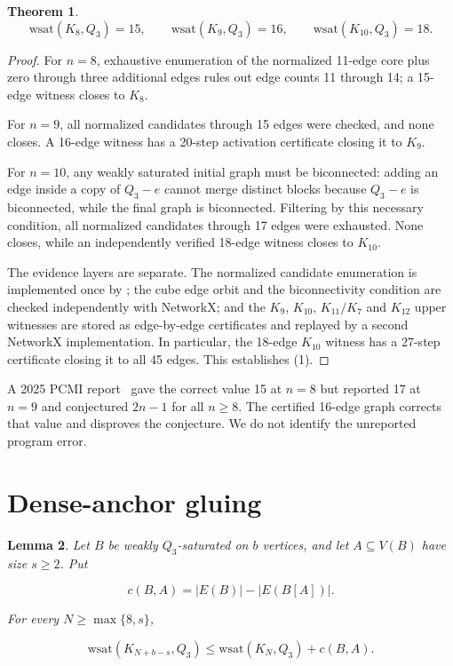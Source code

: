 \documentclass[11pt]{article}
\newtheorem{theorem}{Theorem}
\newtheorem{lemma}[theorem]{Lemma}
\numberwithin{equation}{section}
\begin{document}
\begin{theorem}


\[
\mathrm{wsat}(K_8,Q_3)=15,\qquad
\mathrm{wsat}(K_9,Q_3)=16,\qquad
\mathrm{wsat}(K_{10},Q_3)=18.
\tag{1}
\]

\end{theorem}

\begin{proof}


For $n=8$, exhaustive enumeration of the normalized 11-edge core plus zero through three
additional edges rules out edge counts 11 through 14; a 15-edge witness closes to $K_8$.

For $n=9$, all normalized candidates through 15 edges were checked, and none closes. A 16-edge
witness has a 20-step activation certificate closing it to $K_9$.

For $n=10$, any weakly saturated initial graph must be biconnected: adding an edge inside a copy of
$Q_3-e$ cannot merge distinct blocks because $Q_3-e$ is biconnected, while the final graph is
biconnected. Filtering by this necessary condition, all normalized candidates through 17 edges were
exhausted. None closes, while an independently verified 18-edge witness closes to $K_{10}$.

The evidence layers are separate. The normalized candidate enumeration is implemented once by
{\small{}}; the cube edge orbit and the biconnectivity condition are checked
independently with NetworkX; and the $K_9$, $K_{10}$, $K_{11}/K_7$ and $K_{12}$ upper witnesses
are stored as edge-by-edge certificates and replayed by a second NetworkX implementation. In
particular, the 18-edge $K_{10}$ witness has a 27-step certificate closing it to all 45 edges.
This establishes (1).
\end{proof}


A 2025 PCMI report~\cite{pcmi-q3} gave the correct value 15 at $n=8$ but reported 17 at $n=9$ and conjectured
$2n-1$ for all $n\geq8$. The certified 16-edge graph corrects that value and disproves the
conjecture. We do not identify the unreported program error.

\section{Dense-anchor gluing}


\begin{lemma}


Let $B$ be weakly $Q_3$-saturated on $b$ vertices, and let $A\subseteq V(B)$ have size
$s\geq2$. Put

\[
c(B,A)=|E(B)|-|E(B[A])|.
\]

For every $N\geq\max\{8,s\}$,

\[
\mathrm{wsat}(K_{N+b-s},Q_3)
\leq\mathrm{wsat}(K_N,Q_3)+c(B,A).
\tag{2}
\]

\end{lemma}
\end{document}
